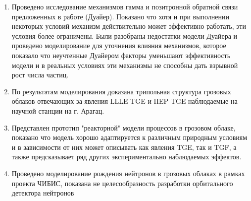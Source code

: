 \begin{enumerate}
  \item Проведено исследование механизмов гамма и позитронной обратной связи предложенных в работе (Дуайер). Показано что хотя и при выполнении некоторых условий механизм действительно может эффективно работать, эти условия более ограничены. Были разобраны недостатки модели Дуайера и проведено моделирование для уточнения влияния механизмов, которое показало что неучтенные Дуайером факторы уменьшают эффективность модели и в реальных условиях эти механизмы не способны дать взрывной рост числа частиц.
  \item По результатам моделирования доказана трипольная структура грозовых облаков отвечающих за явления LLLE TGE и HEP TGE наблюдаемые на научной станции на г. Арагац.
  \item Представлен прототип "реакторной" модели процессов в грозовом облаке, показано что модель хорошо адаптируется к различным природным условиям и в зависимости от них может описывать как явления TGE, так и TGF, а также предсказывает ряд других экспериментально наблюдаемых эффектов. 
  \item Проведено моделирование рождения нейтронов в грозовых облаках в рамках проекта ЧИБИС, показана не целесообразность разработки орбитального детектора нейтронов
\end{enumerate}

